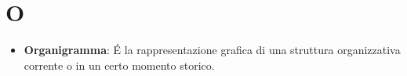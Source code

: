 \section{O}
\begin{itemize}
	\item 
	\textbf{Organigramma}: É la rappresentazione grafica di una struttura organizzativa corrente o in un certo momento storico.
\end{itemize}